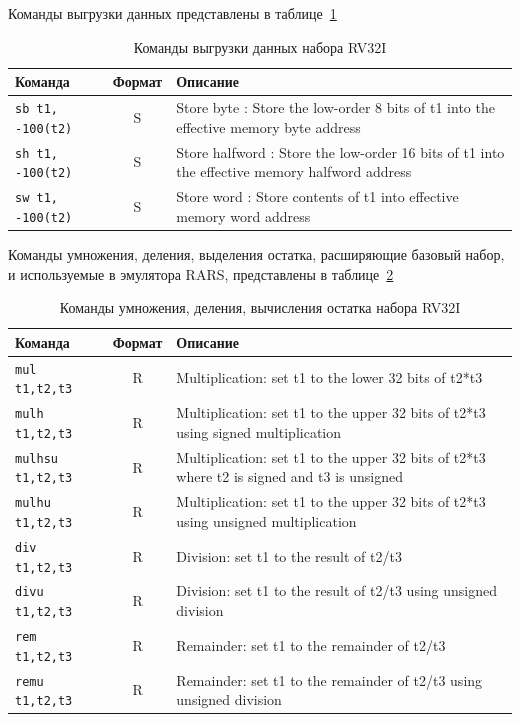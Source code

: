 Команды выгрузки данных представлены в таблице~\ref{table-base-store}

\begin{table}[h]
    \caption{Команды выгрузки данных набора RV32I}
    \centering
    \begin{tabularx}{\textwidth}{|l|c|X|}
        \hline
        \textbf{Команда} & \textbf{Формат} & \textbf{Описание} \\
        \hline \verb|sb t1, -100(t2)| & S & Store byte : Store the low-order 8 bits of t1 into the effective memory byte address \\
        \hline \verb|sh t1, -100(t2)| & S & Store halfword : Store the low-order 16 bits of t1 into the effective memory halfword address \\
        \hline \verb|sw t1, -100(t2)|& S & Store word : Store contents of t1 into effective memory word address \\
        \hline
    \end{tabularx}
    \label{table-base-store}
\end{table}

Команды умножения, деления, выделения остатка, расширяющие базовый набор, и используемые в эмулятора RARS, представлены в таблице~\ref{table-base-mul}

\begin{table}[h]
    \caption{Команды умножения, деления, вычисления остатка набора RV32I}
    \centering
    \begin{tabularx}{\textwidth}{|l|c|X|}
        \hline
        \textbf{Команда} & \textbf{Формат} & \textbf{Описание} \\
        \hline \verb|mul t1,t2,t3| & R & Multiplication: set t1 to the lower 32 bits of t2*t3 \\
        \hline \verb|mulh t1,t2,t3| & R & Multiplication: set t1 to the upper 32 bits of t2*t3 using signed multiplication \\
        \hline \verb|mulhsu t1,t2,t3| & R & Multiplication: set t1 to the upper 32 bits of t2*t3 where t2 is signed and t3 is unsigned \\
        \hline \verb|mulhu t1,t2,t3| & R & Multiplication: set t1 to the upper 32 bits of t2*t3 using unsigned multiplication \\
        \hline \verb|div t1,t2,t3| & R & Division: set t1 to the result of t2/t3 \\
        \hline \verb|divu t1,t2,t3| & R & Division: set t1 to the result of t2/t3 using unsigned division \\
        \hline \verb|rem t1,t2,t3| & R & Remainder: set t1 to the remainder of t2/t3 \\
        \hline \verb|remu t1,t2,t3| & R & Remainder: set t1 to the remainder of t2/t3 using unsigned division \\
        \hline
    \end{tabularx}
    \label{table-base-mul}
\end{table}

